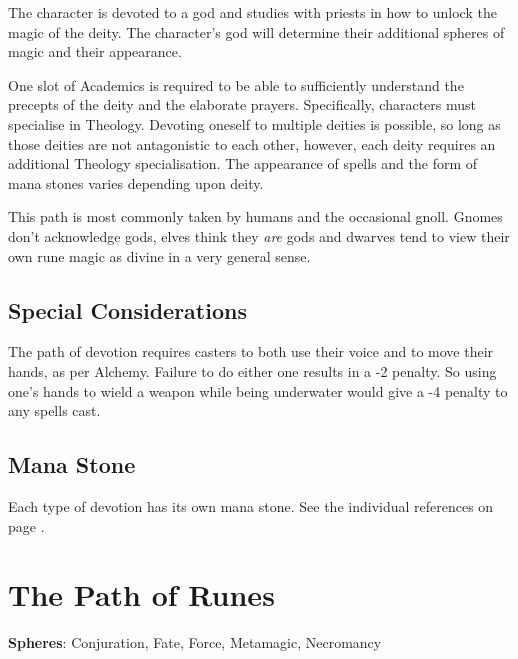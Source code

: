 \begin{multicols}{2}

\noindent The character is devoted to a god and studies with priests in how to unlock the magic of the deity. The character's god will determine their additional spheres of magic and their appearance.

One slot of Academics is required to be able to sufficiently understand the precepts of the deity and the elaborate prayers. Specifically, characters must specialise in Theology. Devoting oneself to multiple deities is possible, so long as those deities are not antagonistic to each other, however, each deity requires an additional Theology specialisation. The appearance of spells and the form of mana stones varies depending upon deity.

This path is most commonly taken by humans and the occasional gnoll. Gnomes don't acknowledge gods, elves think they \emph{are} gods and dwarves tend to view their own rune magic as divine in a very general sense.

\subsection{Special Considerations}

The path of devotion requires casters to both use their voice and to move their hands, as per Alchemy. Failure to do either one results in a -2 penalty. So using one's hands to wield a weapon while being underwater would give a -4 penalty to any spells cast.

\subsection{Mana Stone}

Each type of devotion has its own mana stone.  See the individual references on page \pageref{gods_codes}.

\end{multicols}

\section{The Path of Runes}

\textbf{Spheres}: Conjuration, Fate, Force, Metamagic, Necromancy

